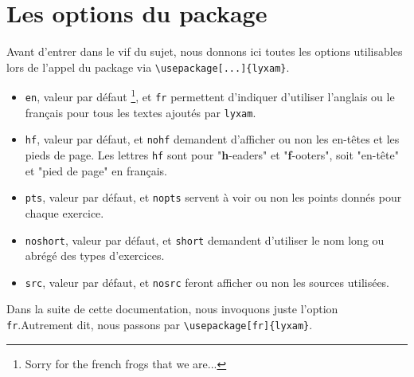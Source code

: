\documentclass[12pt,a4paper]{scrartcl}
\begin{document}
\section{Les options du package}

Avant d'entrer dans le vif du sujet, nous donnons ici toutes les options utilisables lors de l'appel du package via \verb+\usepackage[...]{lyxam}+.

\begin{itemize}[label=\textbullet]

	\item \verb+en+, valeur par défaut
	\footnote{
		Sorry for the french frogs that we are...
	}, et \verb+fr+ permettent d'indiquer d'utiliser l'anglais ou le français pour tous les textes ajoutés par \verb+lyxam+.

	\item \verb+hf+, valeur par défaut, et \verb+nohf+ demandent d'afficher ou non les en-têtes et les pieds de page.
	Les lettres \verb+hf+ sont pour "\textbf{h}-eaders" et "\textbf{f}-ooters", soit "en-tête" et "pied de page" en français.

	\item \verb+pts+, valeur par défaut, et \verb+nopts+ servent à voir ou non les points donnés pour chaque exercice.

	\item \verb+noshort+, valeur par défaut, et \verb+short+ demandent d'utiliser le nom long ou abrégé des types d'exercices.

	\item \verb+src+, valeur par défaut, et \verb+nosrc+ feront afficher ou non les sources utilisées.
\end{itemize}

\begin{remark}
	Dans la suite de cette documentation, nous invoquons juste l'option \verb+fr+.Autrement dit, nous passons par \verb+\usepackage[fr]{lyxam}+.
\end{remark}
\end{document}
